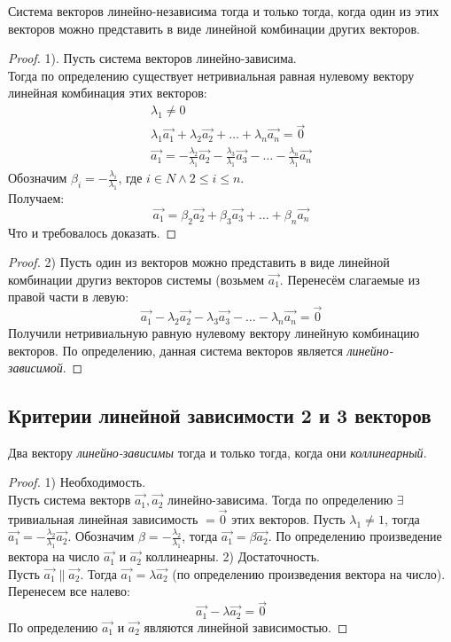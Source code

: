 \begin{theorem}
  Система векторов линейно-независима тогда и только тогда, когда один из этих векторов можно представить в виде линейной комбинации других векторов.
\end{theorem}
\begin{proof}
  1). Пусть система векторов линейно-зависима. \\
  Тогда по определению существует нетривиальная равная нулевому вектору линейная комбинация этих векторов:
  \begin{gather*}
    \lambda_1 \neq  0 \\
    \lambda_1 \vec{a_1} + \lambda_2 \vec{a_2} + \ldots + \lambda_n \vec{a_n} = \vec{0} \\
    \vec{a_1} = - \frac{\lambda_2}{\lambda_1} \vec{a_2} - \frac{\lambda_3}{\lambda_1} \vec{a_3} - \ldots - \frac{\lambda_n}{\lambda_1} \vec{a_n}
  \end{gather*}
  Обозначим $\beta_i = - \frac{\lambda_i}{\lambda_1}$, где $i \in N \land 2 \le i \le n$. \\
  Получаем:
  \[
  \vec{a_1} = \beta_2 \vec{a_2} + \beta_3 \vec{a_3} + \ldots + \beta_n \vec{a_n}
  \] 
  Что и требовалось доказать.
\end{proof}
\begin{proof}
  2) Пусть один из векторов можно представить в виде линейной комбинации другиз векторов системы (возьмем $\vec{a_1}$. Перенесём слагаемые из правой части в левую:
  \[
  \vec{a_1} - \lambda_2 \vec{a_2} - \lambda_3 \vec{a_3} - \ldots - \lambda_n \vec{a_n} = \vec{0}
  \]
  Получили нетривиальную равную нулевому вектору линейную комбинацию векторов. По определению, данная система векторов является \textit{линейно-зависимой}. 
\end{proof}

\subsection{Критерии линейной зависимости 2 и 3 векторов}

\begin{theorem}
  Два вектору \textit{линейно-зависимы} тогда и только тогда, когда они \textit{коллинеарный}.
\end{theorem}
\begin{proof}
  1) Необходимость. \\
Пусть система векторв $\vec{a_1}, \vec{a_2}$ линейно-зависима. Тогда по определению $\exists$ тривиальная линейная зависимость $=\vec{0}$ этих векторов. Пусть $\lambda_1 \neq 1$, тогда $\vec{a_1} = - \frac{\lambda_2}{\lambda_1} \vec{a_2}$. Обозначим $\beta = -\frac{\lambda_2}{\lambda_1}$, тогда $\vec{a_1} = \beta \vec{a_2}$. По определению произведение вектора на число $\vec{a_1}$ и $\vec{a_2}$ коллинеарны.
  2) Достаточность. \\
  Пусть $\vec{a_1} \parallel \vec{a_2}$. Тогда $ \vec{a_1} = \lambda \vec{a_2}$ (по определению произведения вектора на число). Перенесем все налево: 
  \[
  \vec{a_1} - \lambda \vec{a_2} = \vec{0}
  \] 
  По определению $\vec{a_1}$ и $\vec{a_2}$ являются линейной зависимостью.
\end{proof}

